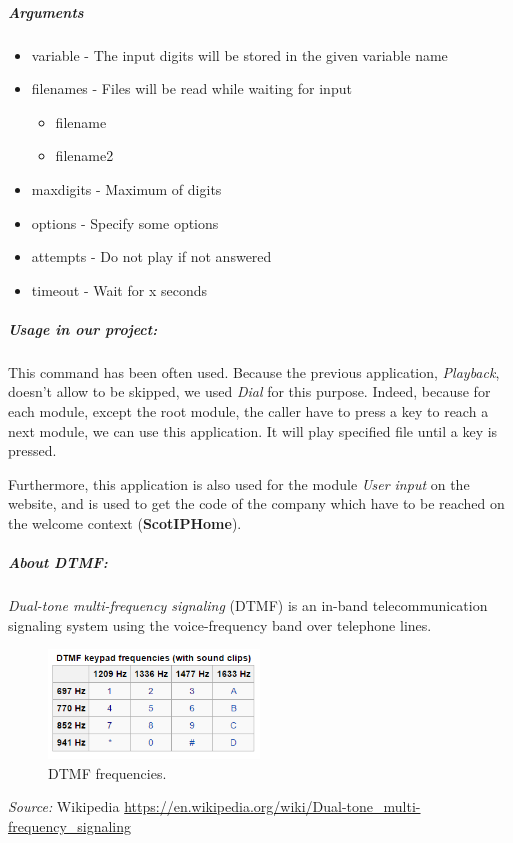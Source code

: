 \subparagraph{Arguments}
\begin{itemize}
	\item variable - The input digits will be stored in the given variable name
	\item filenames - Files will be read while waiting for input
	\begin{itemize}
		\item filename
		\item filename2
	\end{itemize}
	
	\item maxdigits - Maximum of digits
	\item options - Specify some options
	\item attempts - Do not play if not answered
	\item timeout - Wait for x seconds
\end{itemize}

\subparagraph{Usage in our project:}
This command has been often used. Because the previous application, \textit{Playback}, doesn't allow to be skipped, we used \textit{Dial} for this purpose. Indeed, because for each module, except the root module, the caller have to press a key to reach a next module, we can use this application. It will play specified file until a key is pressed. \newline

Furthermore, this application is also used for the module \textit{User input} on the website, and is used to get the code of the company which have to be reached on the welcome context (\textbf{ScotIPHome}). 


\subparagraph{About DTMF:}
\textit{Dual-tone multi-frequency signaling} (DTMF) is an in-band telecommunication signaling system using the voice-frequency band over telephone lines. 

\begin{figure}[H]
  \caption{DTMF frequencies.}
  \centering
    \includegraphics[width=0.5\textwidth]{img/dtmf.png}
\end{figure}

{\textit{Source:} Wikipedia} \url{https://en.wikipedia.org/wiki/Dual-tone_multi-frequency_signaling}
	


